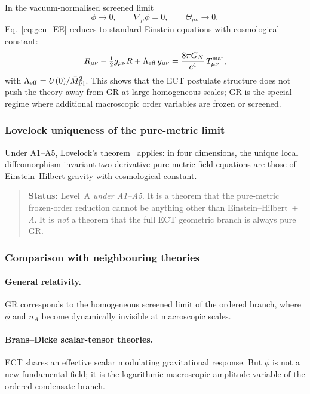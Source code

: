 \documentclass[11pt,a4paper]{article}
\numberwithin{equation}{section}
\begin{document}
In the vacuum-normalised screened limit
\[
\phi\to 0,\qquad \nabla_\mu\phi=0,\qquad\Theta_{\mu\nu}\to 0,
\]
Eq.~\eqref{eq:gen_EE} reduces to standard Einstein equations with
cosmological constant:
\begin{equation}
  \label{eq:EE_standard}
  R_{\mu\nu}-\tfrac{1}{2}g_{\mu\nu}R
  + \Lambda_{\rm eff}\,g_{\mu\nu}
  = \frac{8\pi G_N}{c^4}\,T_{\mu\nu}^{\rm mat},
\end{equation}
with $\Lambda_{\rm eff}=U(0)/\bar M_{\rm Pl}^2$.
This shows that the ECT postulate structure does not push the theory
away from GR at large homogeneous scales; GR is the special regime
where additional macroscopic order variables are frozen or screened.

\subsubsection*{Lovelock uniqueness of the pure-metric limit}

Under A1--A5, Lovelock's theorem~\cite{Lovelock1971} applies:
in four dimensions, the unique local diffeomorphism-invariant
two-derivative pure-metric field equations are those of
Einstein--Hilbert gravity with cosmological constant.
\begin{quote}
  \textbf{Status:} Level~A \emph{under A1--A5}.
  It is a theorem that the pure-metric frozen-order reduction cannot be
  anything other than Einstein--Hilbert~+~$\Lambda$.
  It is \emph{not} a theorem that the full ECT geometric branch is
  always pure GR.
\end{quote}

\subsubsection*{Comparison with neighbouring theories}

\paragraph{General relativity.}
GR corresponds to the homogeneous screened limit of the ordered branch,
where $\phi$ and $n_A$ become dynamically invisible at macroscopic scales.

\paragraph{Brans--Dicke scalar-tensor theories.}
ECT shares an effective scalar modulating gravitational response.
But $\phi$ is not a new fundamental field; it is the logarithmic
macroscopic amplitude variable of the ordered condensate branch.
\end{document}
